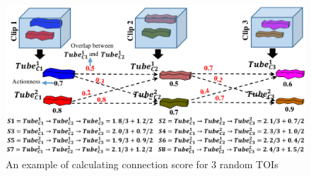 \documentclass{report}
\begin{document}
\begin{figure}[h]
  \centering
  \includegraphics[scale=0.225]{connection_algo}
  \caption{An example of calculating connection score for 3 random TOIs}
  \label{fig:connection_algo}
\end{figure}
\end{document}

